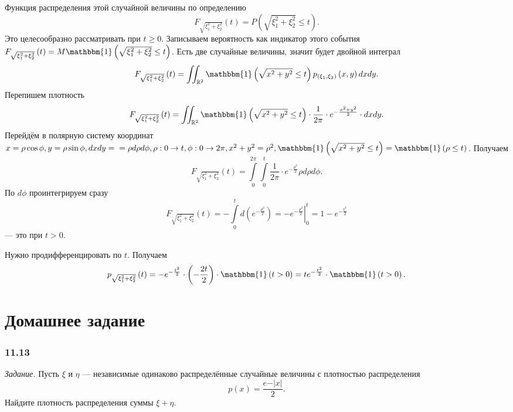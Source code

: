 Функция распределения этой случайной величины по определению
$$F_{ \sqrt{ \xi_1^2 + \xi_2^2}} \left( t \right) =
P \left( \sqrt{ \xi_1^2 + \xi_2^2} \leq t \right).$$
Это целесообразно рассматривать при $t \geq 0$.
Записываем вероятность как индикатор этого события $F_{ \sqrt{ \xi_1^2 + \xi_2^2}} \left( t \right) = M \mathbbm{1} \left( \sqrt{ \xi_1^2 + \xi_2^2} \leq t \right) $.
Есть две случайные величины, значит будет двойной интеграл
$$F_{ \sqrt{ \xi_1^2 + \xi_2^2}} \left( t \right) =
\iint_{ \mathbb{R}^2} \mathbbm{1} \left( \sqrt{x^2 + y^2} \leq t \right) p_{ \left( \xi_1, \xi_2 \right) } \left( x, y \right) dxdy.$$
Перепишем плотность
$$F_{ \sqrt{ \xi_1^2 + \xi_2^2}} \left( t \right) =
\iint_{ \mathbb{R}^2} \mathbbm{1} \left( \sqrt{x^2 + y^2} \leq t \right) \cdot \frac{1}{2 \pi } \cdot e^{- \frac{x^2 + y^2}{2}} \cdot dxdy.$$
Перейдём в полярную систему координат
$x = \rho \cos \phi,
y = \rho \sin \phi,
dxdy = \\
= \rho d \rho d \phi,
\rho: 0 \rightarrow t,
\phi: 0 \rightarrow 2 \pi,
x^2 + y^2 = \rho^2,
\mathbbm{1} \left( \sqrt{x^2 + y^2} \leq t \right) = \mathbbm{1} \left( \rho \leq t \right) $.
Получаем
$$F_{ \sqrt{ \xi_1^2 + \xi_2^2}} \left( t \right) =
\int \limits_0^{2 \pi } \int \limits_0^t \frac{1}{2 \pi } \cdot e^{- \frac{ \rho^2}{2}} \rho d \rho d \phi.$$
По $d \phi $ проинтегрируем сразу
$$F_{ \sqrt{ \xi_1^2 + \xi_2^2}} \left( t \right) =
- \int \limits_0^t d \left( e^{- \frac{ \rho^2}{2}} \right) =
\left. - e^{- \frac{ \rho^2}{2}} \right|_0^t =
1 - e^{- \frac{t^2}{2}}$$
--- это при $t > 0$.

Нужно продифференцировать по $t$.
Получаем
$$p_{ \sqrt{ \xi_1^2 + \xi_2^2}} \left( t \right) =
- e^{- \frac{t^2}{2}} \cdot \left( - \frac{2t}{2} \right) \cdot \mathbbm{1} \left( t > 0 \right) =
te^{- \frac{t^2}{2}} \cdot \mathbbm{1} \left( t > 0 \right).$$

\section*{Домашнее задание}

\subsubsection*{11.13}

\textit{Задание.} Пусть $ \xi $ и $ \eta $ --- независимые одинаково распределённые случайные величины с плотностью распределения
$$p \left( x \right) =
\frac{e{- \left| x \right| }}{2}.$$
Найдите плотность распределения суммы $ \xi + \eta $.

